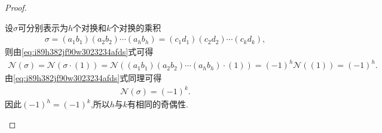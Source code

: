 \documentclass[../../main.tex]{subfiles}%
\begin{document}
\begin{proof}
\begin{enumerate}[(1)]
设$\sigma$可分别表示为$h$个对换和$k$个对换的乘积
\begin{align*}
\sigma = (a_1 b_1)(a_2 b_2)\cdots(a_h b_h) 
= (c_1 d_1)(c_2 d_2)\cdots(c_k d_k),
\end{align*}
则由\eqref{eq:i89h382jf90w3023234afds}式可得
\begin{align*}
\mathcal{N}(\sigma) = \mathcal{N}(\sigma \cdot (1)) 
= \mathcal{N}((a_1 b_1)(a_2 b_2)\cdots(a_h b_h) \cdot (1)) 
= (-1)^h \mathcal{N}((1)) = (-1)^h.
\end{align*}
由\eqref{eq:i89h382jf90w3023234afds}式同理可得
\begin{align*}
\mathcal{N}(\sigma) = (-1)^k.
\end{align*}
因此$(-1)^h = (-1)^k$,所以$h$与$k$有相同的奇偶性.
\end{enumerate}
\end{proof}
\end{document}
